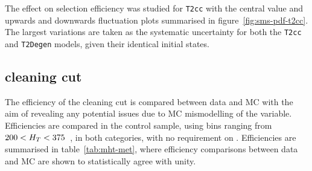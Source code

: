 The effect on selection efficiency was studied for \texttt{T2cc} with the
central value and upwards and downwards fluctuation plots summarised in
figure~\ref{fig:sms-pdf-t2cc}. The largest variations are taken as the
systematic uncertainty for both the \texttt{T2cc} and \texttt{T2Degen} models,
given their identical initial states.

\subsection{\mhtmet cleaning cut}
\label{sec:mhtmet_syst}
The efficiency of the \mhtmet cleaning cut is compared between data and MC with 
the aim of revealing any potential issues due to MC mismodelling of the 
variable. Efficiencies are compared in the \mj control sample, using \HT bins 
ranging from $200 < H_T < 375$~\gev, in both \nj categories, with no requirement
on \nb. Efficiencies are summarised in table~\ref{tab:mht-met}, where 
efficiency comparisons between data and MC are shown to statistically agree
with unity.


